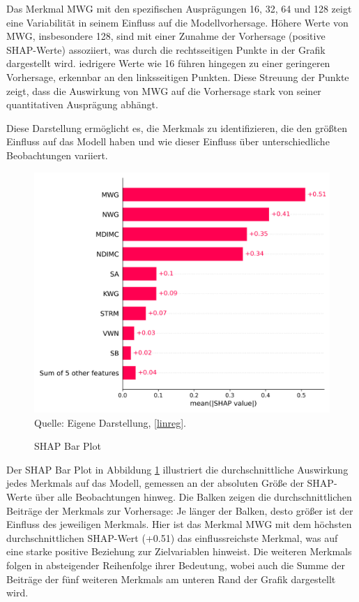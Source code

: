 Das Merkmal MWG mit den spezifischen Ausprägungen 16, 32, 64 und 128 zeigt eine Variabilität 
in seinem Einfluss auf die Modellvorhersage. Höhere Werte von MWG, insbesondere 128, 
sind mit einer Zunahme der Vorhersage (positive SHAP-Werte) assoziiert, 
was durch die rechtsseitigen Punkte in der Grafik dargestellt wird. 
iedrigere Werte wie 16 führen hingegen zu einer geringeren Vorhersage, 
erkennbar an den linksseitigen Punkten. Diese Streuung der Punkte zeigt, 
dass die Auswirkung von MWG auf die Vorhersage stark von seiner quantitativen Ausprägung abhängt.

Diese Darstellung ermöglicht es, die Merkmals zu identifizieren, 
die den größten Einfluss auf das Modell haben und wie dieser Einfluss über 
unterschiedliche Beobachtungen variiert.

\begin{figure}[!h]
    \caption{SHAP Bar Plot}
    \includegraphics[width=1\textwidth]{../scripts/images/shap_bar_plot_gpu.png}
    Quelle: Eigene Darstellung, \ref{linreg}.
    \label{pic:shap_bar}
\end{figure}

Der SHAP Bar Plot in Abbildung \ref{pic:shap_bar} illustriert die durchschnittliche 
Auswirkung jedes Merkmals auf das Modell, gemessen an der absoluten Größe der SHAP-Werte 
über alle Beobachtungen hinweg. Die Balken zeigen die durchschnittlichen Beiträge der 
Merkmals zur Vorhersage: Je länger der Balken, desto größer ist der Einfluss des jeweiligen Merkmals. 
Hier ist das Merkmal MWG mit dem höchsten durchschnittlichen SHAP-Wert (+0.51) das einflussreichste 
Merkmal, was auf eine starke positive Beziehung zur Zielvariablen hinweist. Die weiteren Merkmals 
folgen in absteigender Reihenfolge ihrer Bedeutung, wobei auch die Summe der Beiträge der 
fünf weiteren Merkmals am unteren Rand der Grafik dargestellt wird.
